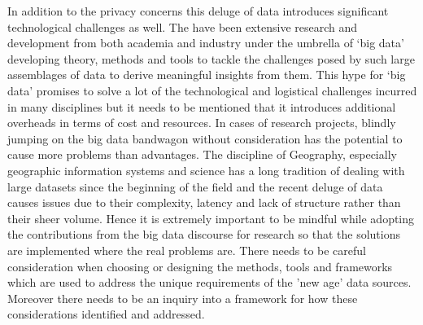In addition to the privacy concerns this deluge of data introduces significant technological challenges as well.
The have been extensive research and development from both academia and industry under the umbrella of `big data' developing theory, methods and tools to tackle the challenges posed by such large assemblages of data to derive meaningful insights from them. 
This hype for `big data' promises to solve a lot of the technological and logistical challenges incurred in many disciplines but it needs to be mentioned that it introduces additional overheads in terms of cost and resources.
In cases of research projects, blindly jumping on the big data bandwagon without consideration has the potential to cause more problems than advantages.
The discipline of Geography, especially geographic information systems and science has a long tradition of dealing with large datasets since the beginning of the field and the recent deluge of data causes issues due to their complexity, latency and lack of structure rather than their sheer volume.
Hence it is extremely important to be mindful while adopting the contributions from the big data discourse for research so that the solutions are implemented where the real problems are.
There needs to be careful consideration when choosing or designing the methods, tools and frameworks which are used to address the unique requirements of the 'new age' data sources.
Moreover there needs to be an inquiry into a framework for how these considerations identified and addressed.


